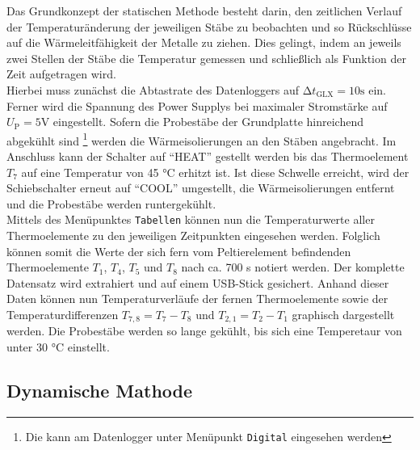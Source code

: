 Das Grundkonzept der statischen Methode besteht darin, den zeitlichen Verlauf der Temperaturänderung der jeweiligen Stäbe zu beobachten und so Rückschlüsse auf die
Wärmeleitfähigkeit der Metalle zu ziehen. Dies gelingt, indem an jeweils zwei Stellen der Stäbe die Temperatur gemessen und schließlich als Funktion der Zeit aufgetragen wird. \\
Hierbei muss zunächst die Abtastrate des Datenloggers auf $\increment t_\text{GLX} = 10\unit{\second}$ ein. Ferner wird die Spannung des Power Supplys bei maximaler Stromstärke auf 
$U_\text{P} = 5\unit{\volt}$ eingestellt. Sofern die Probestäbe der Grundplatte hinreichend abgekühlt sind \footnote{Die kann am Datenlogger unter Menüpunkt \texttt{Digital} eingesehen werden}
werden die Wärmeisolierungen an den Stäben angebracht. Im Anschluss kann der Schalter auf \enquote{HEAT} gestellt werden bis das Thermoelement $T_7$ auf eine Temperatur von 45 \unit{\celsius}
erhitzt ist. Ist diese Schwelle erreicht, wird der Schiebschalter erneut auf \enquote{COOL} umgestellt, die Wärmeisolierungen entfernt und die Probestäbe werden runtergekühlt. \\
Mittels des Menüpunktes \texttt{Tabellen} können nun die Temperaturwerte aller Thermoelemente zu den jeweiligen Zeitpunkten eingesehen werden. Folglich können somit die Werte der
sich fern vom Peltierelement befindenden Thermoelemente $T_1$, $T_4$, $T_5$ und $T_8$ nach ca. 700 \unit{\second} notiert werden. Der komplette Datensatz wird extrahiert und auf einem USB-Stick
gesichert. Anhand dieser Daten können nun Temperaturverläufe der fernen Thermoelemente sowie der Temperaturdifferenzen $T_{7,8} = T_7 - T_8$ und $T_{2,1} = T_2 - T_1$ graphisch dargestellt werden.
Die Probestäbe werden so lange gekühlt, bis sich eine Temperetaur von unter 30 \unit{\celsius} einstellt.

\subsection{Dynamische Mathode}
\label{sec:Dynamische Methode}

